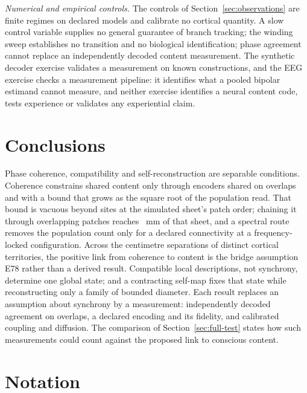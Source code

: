 \documentclass[12pt]{article}
\begin{document}
\emph{Numerical and empirical controls.} The controls of
Section~\ref{sec:observations} are finite regimes on declared models and
calibrate no cortical quantity. A slow control variable supplies no general
guarantee of branch tracking; the winding sweep establishes no transition and
no biological identification; phase agreement cannot replace an independently
decoded content measurement. The synthetic decoder exercise validates a
measurement on known constructions, and the EEG exercise checks a measurement
pipeline: it identifies what a pooled bipolar estimand cannot measure, and
neither exercise identifies a neural content code, tests experience or
validates any experiential claim.

\section{Conclusions}
\label{sec:conclusions}

Phase coherence, compatibility and self-reconstruction are separable conditions. Coherence constrains shared content only through encoders shared on overlaps and with a bound that grows as the square root of the population read. That bound is vacuous beyond \wavePatchInformativeSites{} sites at the simulated sheet's patch order; chaining it through overlapping patches reaches \waveNerveReachMm~mm of that sheet, and a spectral route removes the population count only for a declared connectivity at a frequency-locked configuration. Across the centimetre separations of distinct cortical territories, the positive link from coherence to content is the bridge assumption E78 rather than a derived result. Compatible local descriptions, not synchrony, determine one global state; and a contracting self-map fixes that state while reconstructing only a family of bounded diameter. Each result replaces an assumption about synchrony by a measurement: independently decoded agreement on overlaps, a declared encoding and its fidelity, and calibrated coupling and diffusion. The comparison of Section~\ref{sec:full-test} states how such measurements could count against the proposed link to conscious content.

\section*{Notation}
\end{document}
